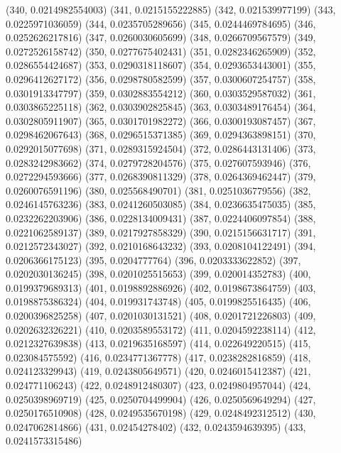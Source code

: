 {					(340, 0.0214982554003)
					(341, 0.0215155222885)
					(342, 0.021539977199)
					(343, 0.0225971036059)
					(344, 0.0235705289656)
					(345, 0.0244469784695)
					(346, 0.0252626217816)
					(347, 0.0260030605699)
					(348, 0.0266709567579)
					(349, 0.0272526158742)
					(350, 0.0277675402431)
					(351, 0.0282346265909)
					(352, 0.0286554424687)
					(353, 0.0290318118607)
					(354, 0.0293653443001)
					(355, 0.0296412627172)
					(356, 0.0298780582599)
					(357, 0.0300607254757)
					(358, 0.0301913347797)
					(359, 0.0302883554212)
					(360, 0.0303529587032)
					(361, 0.0303865225118)
					(362, 0.0303902825845)
					(363, 0.0303489176454)
					(364, 0.0302805911907)
					(365, 0.0301701982272)
					(366, 0.0300193087457)
					(367, 0.0298462067643)
					(368, 0.0296515371385)
					(369, 0.0294363898151)
					(370, 0.0292015077698)
					(371, 0.0289315924504)
					(372, 0.0286443131406)
					(373, 0.0283242983662)
					(374, 0.0279728204576)
					(375, 0.027607593946)
					(376, 0.0272294593666)
					(377, 0.0268390811329)
					(378, 0.0264369462447)
					(379, 0.0260076591196)
					(380, 0.025568490701)
					(381, 0.0251036779556)
					(382, 0.0246145763236)
					(383, 0.0241260503085)
					(384, 0.0236635475035)
					(385, 0.0232262203906)
					(386, 0.0228134009431)
					(387, 0.0224406097854)
					(388, 0.0221062589137)
					(389, 0.0217927858329)
					(390, 0.0215156631717)
					(391, 0.0212572343027)
					(392, 0.0210168643232)
					(393, 0.0208104122491)
					(394, 0.0206366175123)
					(395, 0.0204777764)
					(396, 0.0203333622852)
					(397, 0.0202030136245)
					(398, 0.0201025515653)
					(399, 0.020014352783)
					(400, 0.0199379689313)
					(401, 0.0198892886926)
					(402, 0.0198673864759)
					(403, 0.0198875386324)
					(404, 0.019931743748)
					(405, 0.0199825516435)
					(406, 0.0200396825258)
					(407, 0.0201030131521)
					(408, 0.0201721226803)
					(409, 0.0202632326221)
					(410, 0.0203589553172)
					(411, 0.0204592238114)
					(412, 0.0212327639838)
					(413, 0.0219635168597)
					(414, 0.022649220515)
					(415, 0.023084575592)
					(416, 0.0234771367778)
					(417, 0.0238282816859)
					(418, 0.024123329943)
					(419, 0.0243805649571)
					(420, 0.0246015412387)
					(421, 0.024771106243)
					(422, 0.0248912480307)
					(423, 0.0249804957044)
					(424, 0.0250398969719)
					(425, 0.0250704499904)
					(426, 0.0250569649294)
					(427, 0.0250176510908)
					(428, 0.0249535670198)
					(429, 0.0248492312512)
					(430, 0.0247062814866)
					(431, 0.02454278402)
					(432, 0.0243594639395)
					(433, 0.0241573315486)
}
